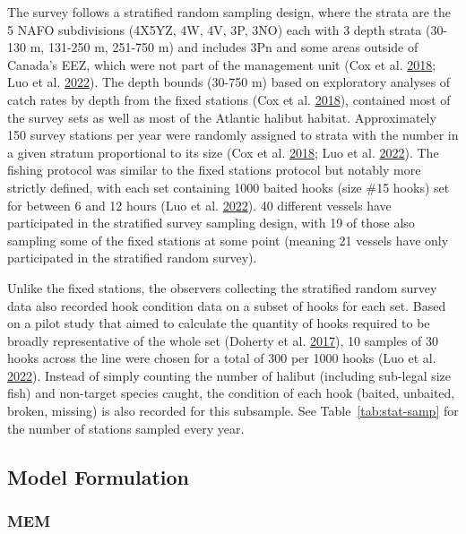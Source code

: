 \documentclass[12pt]{article}\usepackage[]{graphicx}\usepackage[]{color}
\begin{document}
The survey follows a stratified random sampling design, where the strata are the 5 NAFO subdivisions (4X5YZ, 4W, 4V, 3P, 3NO) each with 3 depth strata (30-130 m, 131-250 m, 251-750 m) and includes 3Pn and some areas outside of Canada's EEZ, which were not part of the management unit (Cox et al. \protect\hyperlink{ref-Cox2018}{2018}; Luo et al. \protect\hyperlink{ref-Luo2022}{2022}). The depth bounds (30-750 m) based on exploratory analyses of catch rates by depth from the fixed stations (Cox et al. \protect\hyperlink{ref-Cox2018}{2018}), contained most of the survey sets as well as most of the Atlantic halibut habitat. Approximately 150 survey stations per year were randomly assigned to strata with the number in a given stratum proportional to its size (Cox et al. \protect\hyperlink{ref-Cox2018}{2018}; Luo et al. \protect\hyperlink{ref-Luo2022}{2022}). The fishing protocol was similar to the fixed stations protocol but notably more strictly defined, with each set containing 1000 baited hooks (size \#15 hooks) set for between 6 and 12 hours (Luo et al. \protect\hyperlink{ref-Luo2022}{2022}). 40 different vessels have participated in the stratified survey sampling design, with 19 of those also sampling some of the fixed stations at some point (meaning 21 vessels have only participated in the stratified random survey).

Unlike the fixed stations, the observers collecting the stratified random survey data also recorded hook condition data on a subset of hooks for each set. Based on a pilot study that aimed to calculate the quantity of hooks required to be broadly representative of the whole set (Doherty et al. \protect\hyperlink{ref-Doherty2017}{2017}), 10 samples of 30 hooks across the line were chosen for a total of 300 per 1000 hooks (Luo et al. \protect\hyperlink{ref-Luo2022}{2022}). Instead of simply counting the number of halibut (including sub-legal size fish) and non-target species caught, the condition of each hook (baited, unbaited, broken, missing) is also recorded for this subsample. See Table~\ref{tab:stat-samp} for the number of stations sampled every year.

\hypertarget{model-formulation}{%
\subsection{Model Formulation}\label{model-formulation}}

\hypertarget{mem}{%
\subsubsection{MEM}\label{mem}}
\end{document}
